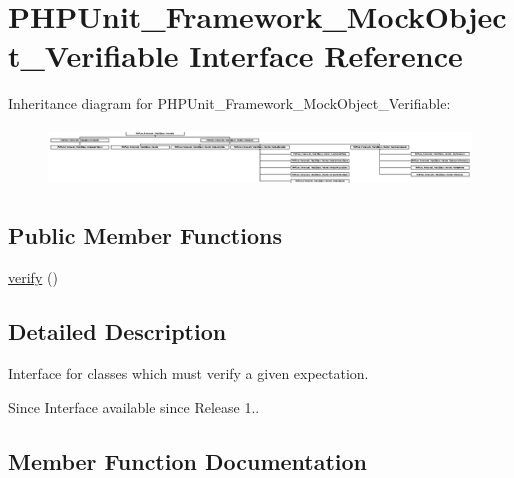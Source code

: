 \hypertarget{interface_p_h_p_unit___framework___mock_object___verifiable}{}\section{P\+H\+P\+Unit\+\_\+\+Framework\+\_\+\+Mock\+Object\+\_\+\+Verifiable Interface Reference}
\label{interface_p_h_p_unit___framework___mock_object___verifiable}
Inheritance diagram for P\+H\+P\+Unit\+\_\+\+Framework\+\_\+\+Mock\+Object\+\_\+\+Verifiable\+:\begin{figure}[H]
\begin{center}
\leavevmode
\includegraphics[height=1.576355cm]{interface_p_h_p_unit___framework___mock_object___verifiable}
\end{center}
\end{figure}
\subsection*{Public Member Functions}
\begin{DoxyCompactItemize}
\item 
\mbox{\hyperlink{interface_p_h_p_unit___framework___mock_object___verifiable_aa33600b6a1b28d0c4dfe4d468272aaa4}{verify}} ()
\end{DoxyCompactItemize}


\subsection{Detailed Description}
Interface for classes which must verify a given expectation.

\begin{DoxySince}{Since}
Interface available since Release 1.. 
\end{DoxySince}


\subsection{Member Function Documentation}
\mbox{\label{interface_p_h_p_unit___framework___mock_object___verifiable_aa33600b6a1b28d0c4dfe4d468272aaa4}} 
